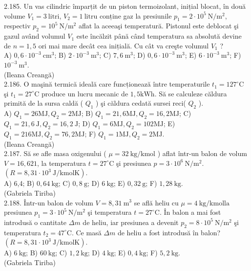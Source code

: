 2.185. Un vas cilindric împarțit de un piston termoizolant, inițial blocat, în două volume $V_{1}=3 \mathrm{~litri}$, $V_{2}=1 \mathrm{~litru}$ conține gaz la presiunile $p_{1}=2 \cdot 10^{5} \mathrm{~N} / \mathrm{m}^{2}$, respectiv $p_{2}=10^{5} \mathrm{~N} / \mathrm{m}^{2}$ aflat la aceeaşi temperatură. Pistonul este deblocat şi gazul având volumul $V_{1}$ este încălzit până când temperatura sa absolută devine de $n=1,5$ ori mai mare decât cea inițială. Cu cât va creşte volumul $V_{1}$ ?\\ A) $0,6 \cdot 10^{-3} \mathrm{~cm}^{3}$; B) $2 \cdot 10^{-3} \mathrm{~m}^{3}$; C) $7,6 \mathrm{~m}^{3}$; D) $0,6 \cdot 10^{-3} \mathrm{~m}^{3}$; E) $6 \cdot 10^{-3} \mathrm{~m}^{3}$; F) $10^{-3} \mathrm{~m}^{3}$.\\ (Ileana Creangă)\\

2.186. O maşină termică ideală care funcționează între temperaturile $t_{1}=127^{\circ} \mathrm{C}$ şi $t_{1}=27^{\circ} \mathrm{C}$ produce un lucru mecanic de $1,5 \mathrm{kWh}$. Să se calculeze căldura primită de la sursa caldă ( $Q_{1}$ ) şi căldura cedată sursei reci( $Q_{2}$ ).\\ A) $Q_{1}=26 \mathrm{MJ}, Q_{2}=2 \mathrm{MJ}$; B) $Q_{1}=21,6 \mathrm{MJ}, Q_{2}=16,2 \mathrm{MJ}$; C) $Q_{1}=21,6 \mathrm{~J}, Q_{2}=16,2 \mathrm{~J}$; D) $Q_{1}=6 \mathrm{MJ}, Q_{2}=102 \mathrm{MJ}$; E) $Q_{1}=216 \mathrm{MJ}, Q_{2}=76,2 \mathrm{MJ}$; F) $Q_{1}=1 \mathrm{MJ}, Q_{2}=2 \mathrm{MJ}$.\\ (Ileana Creangă)\\

2.187. Să se afle masa oxigenului ( $\mu=32 \mathrm{~kg} / \mathrm{kmol}$ ) aflat într-un balon de volum $V=16,621$, la temperatura $t=27^{\circ} \mathrm{C}$ şi presiunea $p=3 \cdot 10^{6} \mathrm{~N} / \mathrm{m}^{2}$. $\left(R=8,31 \cdot 10^{3} \mathrm{~J} / \mathrm{kmolK}\right)$.\\ A) 6,4; B) $0,64 \mathrm{~kg}$; C) $0,8 \mathrm{~g}$; D) $6 \mathrm{~kg}$; E) $0,32 \mathrm{~g}$; F) $1,28 \mathrm{~kg}$.\\ (Gabriela Tiriba)\\

2.188. Într-un balon de volum $V=8,31 \mathrm{~m}^{3}$ se află heliu cu $\mu=4 \mathrm{~kg} / \mathrm{kmol} \mathrm{la}$ presiunea $p_{1}=3 \cdot 10^{5} \mathrm{~N} / \mathrm{m}^{2}$ şi temperatura $t=27^{\circ} \mathrm{C}$. În balon a mai fost introdusă o cantitate $\Delta m$ de heliu, iar presiunea a devenit $p_{2}=8 \cdot 10^{5} \mathrm{~N} / \mathrm{m}^{2}$ şi temperatura $t_{2}=47^{\circ} \mathrm{C}$. Ce masă $\Delta m$ de heliu a fost introdusă în balon? $\left(R=8,31 \cdot 10^{3} \mathrm{~J} / \mathrm{kmol} \mathrm{K}\right)$.\\ A) $6 \mathrm{~kg}$; B) $60 \mathrm{~kg}$; C) $1,2 \mathrm{~kg}$; D) $4 \mathrm{~kg}$; E) $0,4 \mathrm{~kg}$; F) $5,2 \mathrm{~kg}$.\\ (Gabriela Tiriba)\\

